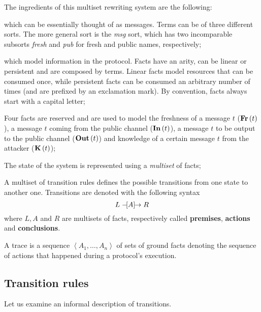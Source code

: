The ingredients of this multiset rewriting system are the following: 

\begin{description}[style=nextline]
    \item[Terms] which can be essentially thought of as messages. Terms can be of three different sorts. The more general sort is the \textit{msg} sort, which has two incomparable subsorts \textit{fresh} and \textit{pub} for fresh and public names, respectively;
    \item[Facts] which model information in the protocol. Facts have an arity, can be linear or persistent and are composed by terms. Linear facts model resources that can be consumed once, while persistent facts can be consumed an arbitrary number of times (and are prefixed by an exclamation mark). By convention, facts always start with a capital letter;
    \item[Special facts] Four facts are reserved and are used to model the freshness of a message $t$ ($\mbox{\textbf{Fr}}\left(t\right)$), a message $t$ coming from the public channel ($\mbox{\textbf{In}}\left(t\right)$), a message $t$ to be output to the public channel ($\mbox{\textbf{Out}}\left(t\right)$) and knowledge of a certain message $t$ from the attacker ($\mbox{\textbf{K}}\left(t\right)$);
    \item[State of the system] The state of the system is represented using a \textit{multiset} of facts;
    \item[Transition rules] A multiset of transition rules defines the possible transitions from one state to another one. Transitions are denoted with the following syntax
    \begin{equation}
        L \mathrel{-\hspace{-2pt}[A]\hspace{-4pt}\to} R
    \end{equation}
    where $L, A$ and $R$ are multisets of facts, respectively called \textbf{premises}, \textbf{actions} and \textbf{conclusions}.
    \item[Trace] A trace is a sequence $\left<A_1, \dots, A_n\right>$ of sets of ground facts denoting the sequence of actions that happened during a protocol's execution.
\end{description}


\subsection{Transition rules}
\label{sub:Transition-rules}
Let us examine an informal description of transitions.

